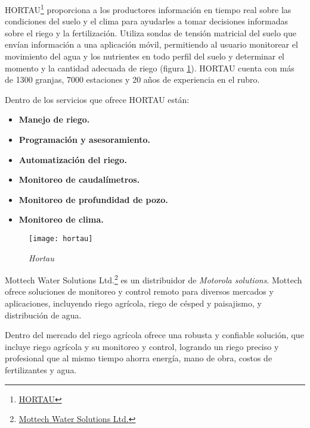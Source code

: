HORTAU\footnote{\href{https://hortau.com/es/}{HORTAU}} proporciona a los productores información en tiempo real sobre las condiciones del suelo y el clima para ayudarles a tomar decisiones informadas sobre el riego y la fertilización.
Utiliza sondas de tensión matricial del suelo que envían información a una aplicación móvil, permitiendo al usuario monitorear el movimiento del agua y los nutrientes en todo perfil del suelo y determinar el momento y la cantidad adecuada de riego (figura \ref{fig:hortau}).
HORTAU cuenta con más de 1300 granjas, 7000 estaciones y 20 años de experiencia en el rubro.

Dentro de los servicios que ofrece HORTAU están:
\begin{itemize}
    \item \textbf{Manejo de riego.}
    \item \textbf{Programación y asesoramiento.}
    \item \textbf{Automatización del riego.}
    \item \textbf{Monitoreo de caudalímetros.}
    \item \textbf{Monitoreo de profundidad de pozo.}
    \item \textbf{Monitoreo de clima.}
\end{itemize}

\begin{figure}[H]
	\centering
	\texttt{[image: hortau]}
	\caption{\label{fig:hortau} \textit{Hortau}}
\end{figure}

Mottech Water Solutions Ltd.\footnote{\href{https://mottech.com/}{Mottech Water Solutions Ltd.}} es un distribuidor de \textit{Motorola solutions}. Mottech ofrece soluciones de monitoreo y control remoto para diversos mercados y aplicaciones, incluyendo riego agrícola, riego de césped y paisajismo, y distribución de agua.

Dentro del mercado del riego agrícola ofrece una robusta y confiable solución, que incluye riego agrícola y su monitoreo y control, logrando un riego preciso y profesional que al mismo tiempo ahorra energía, mano de obra, costos de fertilizantes y agua.

